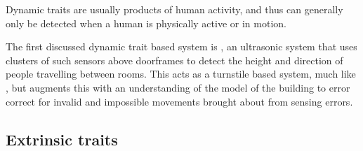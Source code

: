 \documentclass[../thesis/thesis.tex]{subfiles}
\begin{document}
Dynamic traits are usually products of human activity, and thus can generally only be detected when a human is physically active or in motion.

The first discussed dynamic trait based system is \cite{hnat2012doorjamb}, an ultrasonic system that uses clusters of such sensors above doorframes to detect the height and direction of people travelling between rooms. This acts as a turnstile based system, much like \cite{erickson2013poem}, but augments this with an understanding of the model of the building to error correct for invalid and impossible movements brought about from sensing errors.

\subsection{Extrinsic traits}
\label{subsec:litreview:sensors:extrinsic}
\end{document}
